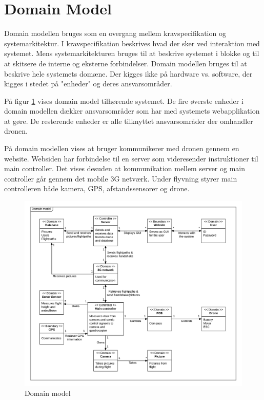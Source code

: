 \section{Domain Model}

Domain modellen bruges som en overgang mellem kravspecifikation og systemarkitektur. 
I kravspecifikation beskrives hvad der sker ved interaktion med systemet. Mens systemarkitekturen bruges til at beskrive systemet i blokke og til at skitsere de interne og eksterne forbindelser. Domain modellen bruges til at beskrive hele systemets domæne. Der kigges ikke på hardware vs. software, der kigges i stedet på "enheder" og deres ansvarsområder.

På figur \ref{fig:domain_model} vises domain model tilhørende systemet. De fire øverste enheder i domain modellen dækker ansvarsområder som har med systemets webapplikation at gøre. De resterende enheder er alle tilknyttet ansvarsområder der omhandler dronen.

På domain modellen vises at bruger kommunikerer med dronen gennem en website. Websiden har forbindelse til en server som videresender instruktioner til main controller. Det vises desuden at kommunikation mellem server og main controller går gennem det mobile 3G netværk. Under flyvning styrer main controlleren både kamera, GPS, afstandssensorer og drone. 

\vspace{-5pt}
\begin{figure}[H]
	\centering
	\includegraphics[width=1.\textwidth]{Billeder/domain_model.png}
	\caption{Domain model}
	\label{fig:domain_model}
\end{figure}

